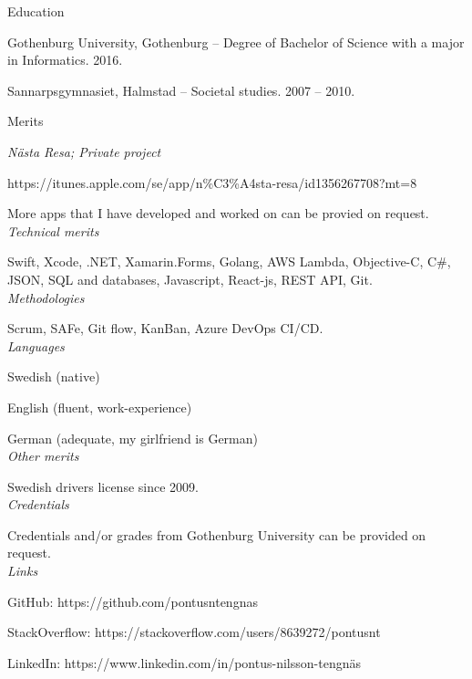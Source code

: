 {\itshape\Large\begin{center}
Education
\end{center}}
  
\vspace{12px}

Gothenburg University, Gothenburg – Degree of Bachelor of Science with a major in Informatics. 2016.

Sannarpsgymnasiet, Halmstad – Societal studies. 2007 – 2010.

\newpage

{\itshape\Large\begin{center}
Merits
\end{center}}
  
\vspace{12px}

{\itshape Nästa Resa; Private project}

https://itunes.apple.com/se/app/n\%C3\%A4sta-resa/id1356267708?mt=8

More apps that I have developed and worked on can be provied on request.\\

{\itshape Technical merits}

Swift, Xcode, .NET, Xamarin.Forms, Golang, AWS Lambda, Objective-C, C\#, 
JSON, SQL and databases, Javascript, React-js, REST API, Git.\\

{\itshape Methodologies}

Scrum, SAFe, Git flow, KanBan, Azure DevOps CI/CD.\\

{\itshape Languages}

Swedish (native)

English (fluent, work-experience)

German (adequate, my girlfriend is German)\\

{\itshape Other merits}

Swedish drivers license since 2009.\\

{\itshape Credentials}

Credentials and/or grades from Gothenburg University can be provided on request.\\

{\itshape Links}

GitHub: https://github.com/pontusntengnas

StackOverflow: https://stackoverflow.com/users/8639272/pontusnt

LinkedIn: https://www.linkedin.com/in/pontus-nilsson-tengnäs